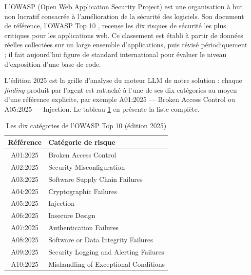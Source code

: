         L'OWASP (Open Web Application Security Project) est une organisation à but non
        lucratif consacrée à l'amélioration de la sécurité des logiciels. Son document de
        référence, l'OWASP Top 10 \cite{OWASP2025}, recense les dix risques de sécurité les
        plus critiques pour les applications web. Ce classement est établi à partir de
        données réelles collectées sur un large ensemble d'applications, puis révisé
        périodiquement ; il fait aujourd'hui figure de standard international pour évaluer
        le niveau d'exposition d'une base de code.

        L'édition 2025 est la grille d'analyse du moteur LLM de notre solution :
        chaque \textit{finding} produit par l'agent est rattaché à l'une de ses dix
        catégories au moyen d'une référence explicite, par exemple
        {\NoAutoSpacing A01:2025} --- Broken Access Control ou
        {\NoAutoSpacing A05:2025} --- Injection. Le tableau \ref{tab:owasp2025} en
        présente la liste complète.

        \begin{table}[H]
        \centering
        \NoAutoSpacing
        \begin{tabular}{|c|m{10.5cm}|}
        \hline
        \textbf{Référence} & \textbf{Catégorie de risque} \\
        \hline
        A01:2025 & Broken Access Control \\
        \hline
        A02:2025 & Security Misconfiguration \\
        \hline
        A03:2025 & Software Supply Chain Failures \\
        \hline
        A04:2025 & Cryptographic Failures \\
        \hline
        A05:2025 & Injection \\
        \hline
        A06:2025 & Insecure Design \\
        \hline
        A07:2025 & Authentication Failures \\
        \hline
        A08:2025 & Software or Data Integrity Failures \\
        \hline
        A09:2025 & Security Logging and Alerting Failures \\
        \hline
        A10:2025 & Mishandling of Exceptional Conditions \\
        \hline
        \end{tabular}
        \caption{Les dix catégories de l'OWASP Top 10 (édition 2025)}
        \label{tab:owasp2025}
        \end{table}

